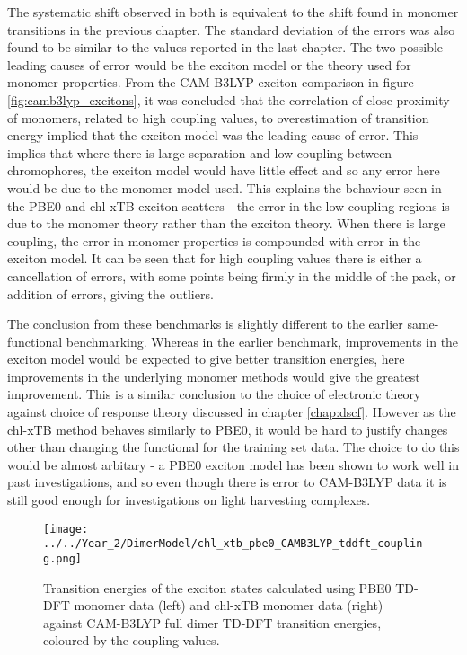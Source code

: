 The systematic shift observed in both is equivalent to the shift found in monomer
transitions in the previous chapter. The standard deviation of the errors was also
found to be similar to the values reported in the last chapter.
The two possible leading causes of error would be the exciton model or the theory 
used for monomer properties. From the CAM-B3LYP exciton comparison in figure \ref{fig:camb3lyp_excitons},
it was concluded that the correlation of close proximity of monomers, related to 
high coupling values, to overestimation of transition energy implied that the exciton
model was the leading cause of error. This implies that where there is large separation
and low coupling between chromophores, the exciton model would have little effect
and so any error here would be due to the monomer model used. This explains the 
behaviour seen in the PBE0 and chl-xTB exciton scatters - the error in the low coupling
regions is due to the monomer theory rather than the exciton theory. When there is 
large coupling, the error in monomer properties is compounded with error in the
exciton model. It can be seen that for high coupling values there is either a cancellation
of errors, with some points being firmly in the middle of the pack, or addition 
of errors, giving the outliers.

The conclusion from these benchmarks is slightly different to the earlier same-functional
benchmarking. Whereas in the earlier benchmark, improvements in the exciton model
would be expected to give better transition energies, here improvements in the underlying
monomer methods would give the greatest improvement. This is a similar conclusion
to the choice of electronic theory against choice of response theory discussed in
chapter \ref{chap:dscf}. However as the chl-xTB method behaves similarly to PBE0,
it would be hard to justify changes other than changing the functional for the training 
set data. The choice to do this would be almost arbitary - a PBE0 exciton model has
been shown to work well in past investigations, and so even though there is error
to CAM-B3LYP data it is still good enough for investigations on light harvesting 
complexes.

\begin{figure}
    \centering
    \texttt{[image: ../../Year\_2/DimerModel/chl\_xtb\_pbe0\_CAMB3LYP\_tddft\_coupling.png]}
    \label{fig:chl_xtb_pbe0_LH2}
    \caption{Transition energies of the exciton states calculated using PBE0 TD-DFT
    monomer data (left) and chl-xTB monomer data (right) against CAM-B3LYP full
    dimer TD-DFT transition energies, coloured by the coupling values.}
\end{figure}


